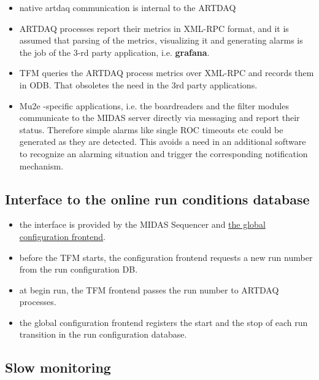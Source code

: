 \begin{itemize}
\item
  native artdaq communication is internal to the ARTDAQ
\item
  ARTDAQ processes report their metrics in XML-RPC format,
  and it is assumed that parsing of the metrics, visualizing
  it and generating alarms is the job of the 3-rd party application,
  i.e. {\bf grafana}.
\item
  TFM queries the ARTDAQ process metrics over XML-RPC and records
  them in ODB. That obsoletes the need in the 3rd party applications.
\item
  Mu2e -specific applications, i.e. the boardreaders and the filter modules 
  communicate to the MIDAS server directly via messaging and report 
  their status. Therefore simple alarms like single ROC timeouts etc
  could be generated as they are detected. 
  This avoids a need in an additional software to recognize an alarming
  situation and trigger the corresponding notification mechanism.
\end{itemize}


\subsection{Interface to the online run conditions database} 

\begin{itemize}
\item
  the interface is provided by the MIDAS Sequencer and 
  \href{https://github.com/pavel1murat/frontends/blob/main/conf/mu2e_config_fe.py}
  {\blue the global configuration frontend}.
\item
  before the TFM starts, the configuration frontend requests a new run 
  number from the run configuration DB.
\item
  at begin run, the TFM frontend passes the run number to ARTDAQ processes.
\item
  the global configuration frontend registers the start and the stop of each
  run transition in the run configuration database.
\end{itemize}


\subsection{Slow monitoring}

